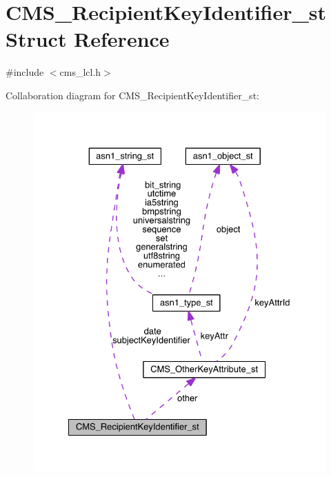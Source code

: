 \hypertarget{struct_c_m_s___recipient_key_identifier__st}{}\section{C\+M\+S\+\_\+\+Recipient\+Key\+Identifier\+\_\+st Struct Reference}
\label{struct_c_m_s___recipient_key_identifier__st}


{\ttfamily \#include $<$cms\+\_\+lcl.\+h$>$}



Collaboration diagram for C\+M\+S\+\_\+\+Recipient\+Key\+Identifier\+\_\+st\+:\nopagebreak
\begin{figure}[H]
\begin{center}
\leavevmode
\includegraphics[width=328pt]{struct_c_m_s___recipient_key_identifier__st__coll__graph}
\end{center}
\end{figure}
